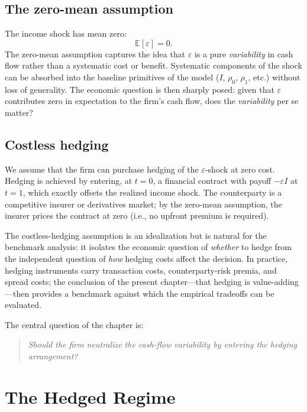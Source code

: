 \documentclass[11pt,a4paper,oneside]{book}
\def\E{\mathbb{E}}
\theoremstyle{plain}
\theoremstyle{definition}
\theoremstyle{remark}
\numberwithin{equation}{chapter}
\begin{document}
\subsection{The zero-mean assumption}

The income shock has mean zero:
\begin{equation}\label{eq:RM-mean-zero}
  \E[\varepsilon] = 0.
\end{equation}
The zero-mean assumption captures the idea that $\varepsilon$ is a pure \emph{variability} in cash flow rather than a systematic cost or benefit.
Systematic components of the shock can be absorbed into the baseline primitives of the model ($I$, $\rho_0$, $\rho_1$, etc.) without loss of generality.
The economic question is then sharply posed: given that $\varepsilon$ contributes zero in expectation to the firm's cash flow, does the \emph{variability} per se matter?

\subsection{Costless hedging}

We assume that the firm can purchase hedging of the $\varepsilon$-shock at zero cost.
Hedging is achieved by entering, at $t=0$, a financial contract with payoff $-\varepsilon I$ at $t=1$, which exactly offsets the realized income shock.
The counterparty is a competitive insurer or derivatives market; by the zero-mean assumption, the insurer prices the contract at zero (i.e., no upfront premium is required).

The costless-hedging assumption is an idealization but is natural for the benchmark analysis: it isolates the economic question of \emph{whether} to hedge from the independent question of \emph{how} hedging costs affect the decision.
In practice, hedging instruments carry transaction costs, counterparty-risk premia, and spread costs; the conclusion of the present chapter---that hedging is value-adding---then provides a benchmark against which the empirical tradeoffs can be evaluated.

The central question of the chapter is:

\begin{quote}
\emph{Should the firm neutralize the cash-flow variability by entering the hedging arrangement?}
\end{quote}

\section{The Hedged Regime}
\label{sec:RM-hedged}
\end{document}
